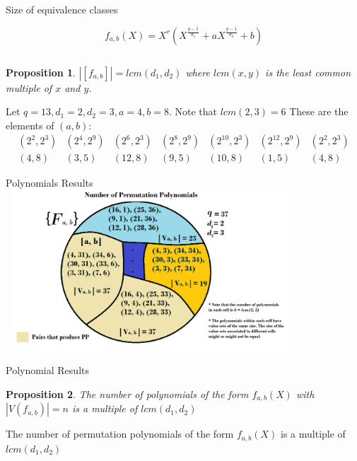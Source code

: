 \documentclass{beamer}
\newtheorem{proposition}{Proposition}
\begin{document}
\begin{frame}{Size of equivalence classes}
  
  {\Large $$f_{a,b}(X) = X^r(X^{\frac{q-1}{d_1}} + aX^{\frac{q-1}{d_2}} +b)$$}

  $$$$

  \begin{proposition}
    $|[f_{a, b}]| = lcm(d_1,d_2)$ where $lcm(x,y)$ is the least common multiple of $x$ and $y$.
  \end{proposition}

  \begin{example}
    Let $q = 13, d_1 = 2, d_2 = 3, a = 4, b = 8$. Note that $lcm(2,3) = 6$ These are the elements of $(a,b)$:
    {\small $$\begin{array}{ccccccc}
                  (2^2, 2^3) & (2^4, 2^9) & (2^6, 2^3) & (2^8, 2^9) & (2^{10}, 2^3) & (2^{12}, 2^9) & (2^2, 2^3) \\
                  
                  (4, 8) & (3, 5) & (12, 8) & (9, 5) & (10, 8) & (1, 5) & (4, 8) 
                \end{array}$$}
  \end{example}
\end{frame}

\begin{frame}{Polynomials Results}
  \includegraphics[width=11cm, height=6cm]{clases}
\end{frame}

\begin{frame}{Polynomial Results}
    \begin{proposition}
    The number of polynomials of the form $f_{a, b}(X)$ with $|V(f_{a, b})| = n$ is a multiple of $lcm(d_1, d_2)$
  \end{proposition}

  \begin{corollary}
    The number of permutation polynomials of the form $f_{a, b}(X)$ is a multiple of $lcm(d_1, d_2)$
  \end{corollary}
\end{frame}
\end{document}
